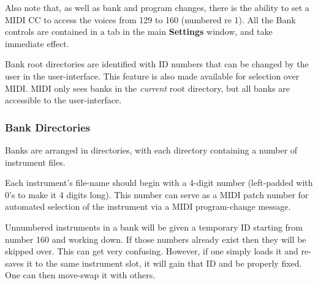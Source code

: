 %

   Also note that, as well as bank and program changes, there is the ability
   to set a MIDI CC to access the voices from 129 to 160 (numbered re 1).
   All the Bank
   controls are contained in a tab in the main \textbf{Settings}
   window, and take immediate effect.

   Bank root directories are identified with ID numbers that can be changed
   by the user in the user-interface. This feature is also made available for
   selection over MIDI.  MIDI only sees banks in the \textsl{current} root
   directory, but all banks are accessible to the user-interface.

\subsubsection{Bank Directories}
\label{subsubsec:banks_and_roots_bank_directories}

   Banks are arranged in directories, with each directory containing a number
   of instrument files.

   Each instrument's file-name should begin with a 4-digit number
   (left-padded with 0's to make it 4 digits long).  This number can serve
   as a MIDI patch number for automated selection of the instrument via a
   MIDI program-change message.

   Unnumbered instruments in a bank will be given a temporary ID starting
   from number 160 and working down. If those numbers already exist then
   they will be skipped over. This can get very confusing. However, if one
   simply loads it and re-saves it to the same instrument slot, it will gain
   that ID and be properly fixed.  One can then move-swap it with others.


